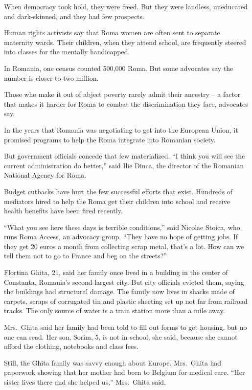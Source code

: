 ﻿\documentclass[12pt]{article}
\begin{document}
When democracy took hold, they were freed. But they were landless, uneducated and dark-skinned, and
they had few prospects.

Human rights activists say that Roma women are often sent to separate maternity wards. Their
children, when they attend school, are frequently steered into classes for the mentally handicapped.

In Romania, one census counted 500,000 Roma. But some advocates say the number is closer to two
million.

Those who make it out of abject poverty rarely admit their ancestry -- a factor that makes it harder
for Roma to combat the discrimination they face, advocates say.

In the years that Romania was negotiating to get into the European Union, it promised programs to
help the Roma integrate into Romanian society.

But government officials concede that few materialized. ``I think you will see the current
administration do better,'' said Ilie Dinca, the director of the Romanian National Agency for Roma.

Budget cutbacks have hurt the few successful efforts that exist. Hundreds of mediators hired to help
the Roma get their children into school and receive health benefits have been fired recently.

``What you see here these days is terrible conditions,'' said Nicolae Stoica, who runs Roma Access,
an advocacy group. ``They have no hope of getting jobs. If they get 20 euros a month from collecting
scrap metal, that's a lot. How can we tell them not to go to France and beg on the streets?''

Flortina Ghita, 21, said her family once lived in a building in the center of Constanta, Romania's
second largest city. But city officials evicted them, saying the buildings had structural damage.
The family now lives in shacks made of carpets, scraps of corrugated tin and plastic sheeting set up
not far from railroad tracks. The only source of water is a train station more than a mile away.

Mrs.~Ghita said her family had been told to fill out forms to get housing, but no one can read. Her
son, Sorim, 5, is not in school, she said, because she cannot afford the clothing, notebooks and
class fees.

Still, the Ghita family was savvy enough about Europe. Mrs.~Ghita had paperwork showing that her
mother had been to Belgium for medical care. ``Her sister lives there and she helped us,''
Mrs.~Ghita said.
\end{document}
